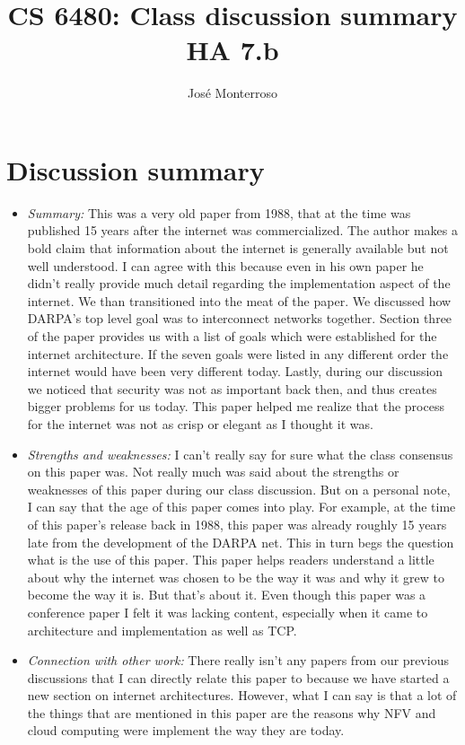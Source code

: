 \documentclass[letterpaper,twocolumn,10pt]{article}
\title{CS 6480: Class discussion summary\\
HA 7.b\\}
\author{José Monterroso}
\affil{School of Computing, University of Utah}
\begin{document}
\maketitle
\section*{Discussion summary}

\begin{itemize}

\item {\it Summary:} 
This was a very old paper from 1988, that at the time was published 15 years after the internet
was commercialized. The author makes a bold claim that information about the internet is generally 
available but not well understood. I can agree with this because even in his own paper he didn't 
really provide much detail regarding the implementation aspect of the internet. We than transitioned 
into the meat of the paper. We discussed how DARPA's top level goal was to interconnect networks 
together. Section three of the paper provides us with a list of goals which were established for the
internet architecture. If the seven goals were listed in any different order the internet would have 
been very different today. Lastly, during our discussion we noticed that security was not as important 
back then, and thus creates bigger problems for us today. This paper helped me realize that the 
process for the internet was not as crisp or elegant as I thought it was. 

\item {\it Strengths and weaknesses:} 
I can't really say for sure what the class consensus on this paper was. Not really much was said
about the strengths or weaknesses of this paper during our class discussion. But on a personal 
note, I can say that the age of this paper comes into play. For example, at the time of this paper's
release back in 1988, this paper was already roughly 15 years late from the development of the DARPA
net. This in turn begs the question what is the use of this paper. This paper helps readers understand a 
little about why the internet was chosen to be the way it was and why it grew to become the way it is. 
But that's about it. Even though this paper was a conference paper I felt 
it was lacking content, especially when it came to architecture and implementation as well as TCP. 

\item {\it Connection with other work:} 
There really isn't any papers from our previous discussions that I can directly relate this paper to 
because we have started a new section on internet architectures. However, what I can say is that 
a lot of the things that are mentioned in this paper are the reasons why NFV and cloud computing 
were implement the way they are today. 


\end{itemize}
\end{document}
